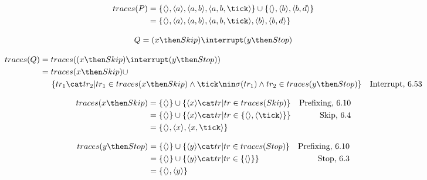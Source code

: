 \documentclass{scrreprt}
\begin{document}
\begin{align*}
  traces(P) &= \{ \langle \rangle, \langle a \rangle, \langle a, b \rangle, \langle a, b, \tick \rangle \} \cup \{ \langle \rangle, \langle b \rangle, \langle b, d \rangle \} \\
            &= \{ \langle \rangle, \langle a \rangle, \langle a, b \rangle, \langle a, b, \tick \rangle, \langle b \rangle, \langle b, d \rangle \}
\end{align*}

\newpage

\begin{equation*}
  Q = (x \then Skip) \interrupt (y \then Stop)
\end{equation*}

\begin{align*}
  traces(Q) &= traces((x \then Skip) \interrupt (y \then Stop)) \\
            &= traces(x \then Skip) \cup \\
            &\hspace{0.5cm} \{ tr_1 \cat tr_2 | tr_1 \in traces(x \then Skip) \wedge \tick \nin \sigma(tr_1) \wedge tr_2 \in traces(y \then Stop) \} & \text{Interrupt, 6.53}
\end{align*}

\begin{align*}
  traces(x \then Skip) &= \{ \langle \rangle \} \cup \{ \langle x \rangle \cat tr | tr \in traces(Skip) \} & \text{Prefixing, 6.10} \\
                       &= \{ \langle \rangle \} \cup \{ \langle x \rangle \cat tr | tr \in \{ \langle \rangle, \langle \tick \rangle \} \} & \text{Skip, 6.4} \\
                       &= \{ \langle \rangle, \langle x \rangle, \langle x, \tick \rangle \}
\end{align*}

\begin{align*}
  traces(y \then Stop) &= \{ \langle \rangle \} \cup \{ \langle y \rangle \cat tr | tr \in traces(Stop) \} & \text{Prefixing, 6.10} \\
                       &= \{ \langle \rangle \} \cup \{ \langle y \rangle \cat tr | tr \in \{ \langle \rangle \} \} & \text{Stop, 6.3} \\
                       &= \{ \langle \rangle, \langle y \rangle \}
\end{align*}
\end{document}
